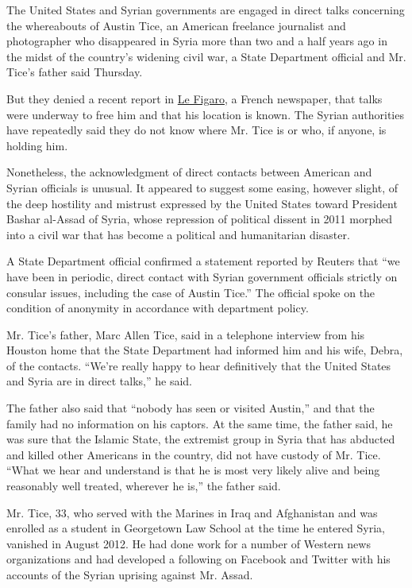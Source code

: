 The United States and Syrian governments are engaged in direct talks
concerning the whereabouts of Austin Tice, an American freelance
journalist and photographer who disappeared in Syria more than two and a
half years ago in the midst of the country's widening civil war, a State
Department official and Mr. Tice's father said Thursday.

But they denied a recent report in
\href{http://www.lefigaro.fr/international/2015/03/20/01003-20150320ARTFIG00446-washington-et-damas-discutent-d-un-otage.php}{Le
Figaro}, a French newspaper, that talks were underway to free him and
that his location is known. The Syrian authorities have repeatedly said
they do not know where Mr. Tice is or who, if anyone, is holding him.

Nonetheless, the acknowledgment of direct contacts between American and
Syrian officials is unusual. It appeared to suggest some easing, however
slight, of the deep hostility and mistrust expressed by the United
States toward President Bashar al-Assad of Syria, whose repression of
political dissent in 2011 morphed into a civil war that has become a
political and humanitarian disaster.

A State Department official confirmed a statement reported by Reuters
that ``we have been in periodic, direct contact with Syrian government
officials strictly on consular issues, including the case of Austin
Tice.'' The official spoke on the condition of anonymity in accordance
with department policy.

Mr. Tice's father, Marc Allen Tice, said in a telephone interview from
his Houston home that the State Department had informed him and his
wife, Debra, of the contacts. ``We're really happy to hear definitively
that the United States and Syria are in direct talks,'' he said.

The father also said that ``nobody has seen or visited Austin,'' and
that the family had no information on his captors. At the same time, the
father said, he was sure that the Islamic State, the extremist group in
Syria that has abducted and killed other Americans in the country, did
not have custody of Mr. Tice. ``What we hear and understand is that he
is most very likely alive and being reasonably well treated, wherever he
is,'' the father said.

Mr. Tice, 33, who served with the Marines in Iraq and Afghanistan and
was enrolled as a student in Georgetown Law School at the time he
entered Syria, vanished in August 2012. He had done work for a number of
Western news organizations and had developed a following on Facebook and
Twitter with his accounts of the Syrian uprising against Mr. Assad.


